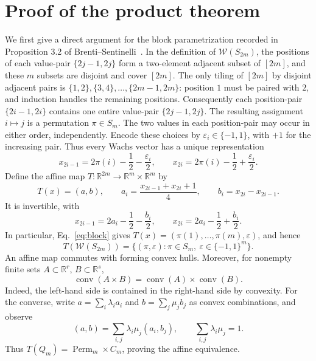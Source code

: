 \documentclass[11pt]{article}
\newcommand{\W}{\mathcal W}
\newcommand{\conv}{\operatorname{conv}}
\newcommand{\Perm}{\operatorname{Perm}}
\begin{document}
\section{Proof of the product theorem}
We first give a direct argument for the block parametrization recorded in Proposition 3.2 of Brenti--Sentinelli~\cite{BS}. In the definition of $\W(S_{2m})$, the positions of each value-pair $\{2j-1,2j\}$ form a two-element adjacent subset of $[2m]$, and these $m$ subsets are disjoint and cover $[2m]$. The only tiling of $[2m]$ by disjoint adjacent pairs is $\{1,2\},\{3,4\},\ldots,\{2m-1,2m\}$: position $1$ must be paired with $2$, and induction handles the remaining positions. Consequently each position-pair $\{2i-1,2i\}$ contains one entire value-pair $\{2j-1,2j\}$. The resulting assignment $i\mapsto j$ is a permutation $\pi\in S_m$. The two values in each position-pair may occur in either order, independently. Encode these choices by $\varepsilon_i\in\{-1,1\}$, with $+1$ for the increasing pair. Thus every Wachs vector has a unique representation
\begin{equation}\label{eq:block}
x_{2i-1}=2\pi(i)-\frac12-\frac{\varepsilon_i}{2},\qquad
x_{2i}=2\pi(i)-\frac12+\frac{\varepsilon_i}{2}.
\end{equation}
Define the affine map $T:\mathbb R^{2m}\to\mathbb R^m\times\mathbb R^m$ by
\begin{equation}\label{eq:affine}
T(x)=(a,b),\qquad a_i=\frac{x_{2i-1}+x_{2i}+1}{4},\qquad b_i=x_{2i}-x_{2i-1}.
\end{equation}
It is invertible, with
\begin{equation}\label{eq:inverse}
x_{2i-1}=2a_i-\frac12-\frac{b_i}{2},\qquad x_{2i}=2a_i-\frac12+\frac{b_i}{2}.
\end{equation}
In particular, Eq.~\eqref{eq:block} gives $T(x)=(\pi(1),\ldots,\pi(m),\varepsilon)$, and hence
\[T(\W(S_{2m}))=\{(\pi,\varepsilon):\pi\in S_m,\ \varepsilon\in\{-1,1\}^m\}.\]
An affine map commutes with forming convex hulls. Moreover, for nonempty finite sets $A\subset\mathbb R^r$, $B\subset\mathbb R^s$,
\begin{equation}\label{eq:convprod}\conv(A\times B)=\conv(A)\times\conv(B).\end{equation}
Indeed, the left-hand side is contained in the right-hand side by convexity. For the converse, write $a=\sum_i\lambda_i a_i$ and $b=\sum_j\mu_j b_j$ as convex combinations, and observe
\[(a,b)=\sum_{i,j}\lambda_i\mu_j(a_i,b_j),\qquad\sum_{i,j}\lambda_i\mu_j=1.\]
Thus $T(Q_m)=\Perm_m\times C_m$, proving the affine equivalence.
\end{document}
